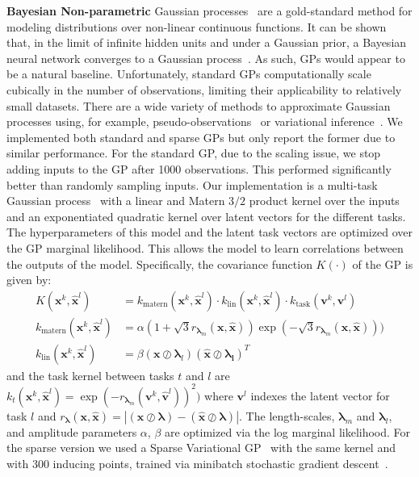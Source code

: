 \documentclass{article} \usepackage{iclr2018_conference,times}
\begin{document}
\textbf{Bayesian Non-parametric} Gaussian processes~\citep{Rasmussen2005} are a gold-standard method for modeling distributions over non-linear continuous functions.  It can be shown that, in the limit of infinite hidden units and under a Gaussian prior, a Bayesian neural network converges to a Gaussian process~\citep{Neal1994}.  As such, GPs would appear to be a natural baseline.  Unfortunately, standard GPs computationally scale cubically in the number of observations, limiting their applicability to relatively small datasets.  There are a wide variety of methods to approximate Gaussian processes using, for example, pseudo-observations~\citep{snelson-ghahramani2006} or variational inference~\citep{titsias2009}.  We implemented both standard and sparse GPs but only report the former due to similar performance.  For the standard GP, due to the scaling issue, we stop adding inputs to the GP after 1000 observations.  This performed significantly better than randomly sampling inputs.  Our implementation is a multi-task Gaussian process~\citep{Bonilla2008} with a linear and Matern ${3}/{2}$ product kernel over the inputs and an exponentiated quadratic kernel over latent vectors for the different tasks.  The hyperparameters of this model and the latent task vectors are optimized over the GP marginal likelihood. This allows the model to learn correlations between the outputs of the model.
Specifically, the covariance function $K(\cdot)$ of the GP is given by:
\newcommand{\brmx}{\mathrm{\mathbf{x}}}
\newcommand{\blambda}{\mathbf{\lambda}}
\newcommand{\brmxhat}{\mathrm{\mathbf{\hat{x}}}}
\newcommand{\brmv}{\mathrm{\mathbf{v}}}
\newcommand{\brmvhat}{\mathrm{\mathbf{\hat{v}}}}
\begin{align}
K(\brmx^k, \brmxhat^l) &= k_{\mathrm{matern}}(\brmx^k, \brmxhat^l) \cdot k_{\mathrm{lin}}(\brmx^k, \brmxhat^l) \cdot k_{\mathrm{task}}(\mathrm{\mathbf{v}}^k, \mathrm{\mathbf{v}}^l) \\
k_{\mathrm{matern}}(\brmx^k, \brmxhat^l) &= \alpha(1 + \sqrt{3}r_{\blambda_m}(\brmx, \brmxhat))\exp(-\sqrt{3}r_{\blambda_m}(\brmx, \brmxhat))) \\
k_{\mathrm{lin}}(\brmx^k, \brmxhat^l) &= \beta(\brmx\oslash\blambda_l)(\brmxhat\oslash\mathbf{\blambda_l})^T
\end{align}
and the task kernel between tasks $t$ and $l$ are $k_t(\brmx^k, \brmxhat^l) = \exp(-r_{\blambda_m}(\brmv^k, \brmvhat^l))^2)$ where $\brmv^l$ indexes the latent vector for task $l$ and $r_{\blambda}(\brmx, \brmxhat) = | (\brmx\oslash\blambda) - (\brmxhat\oslash\blambda) |$. The length-scales, $\blambda_m$ and $\blambda_l$, and amplitude parameters $\alpha$, $\beta$ are optimized via the log marginal likelihood. For the sparse version we used a Sparse Variational GP~\citep{hensman2014} with the same kernel and with 300 inducing points, trained via minibatch stochastic gradient descent~\citep{GPflow2017}.
\end{document}

